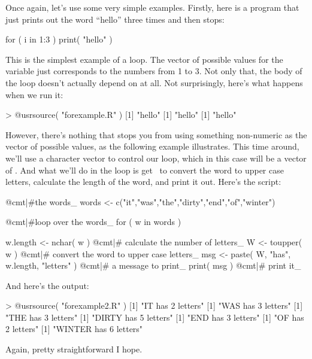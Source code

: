 Once again, let's use some very simple examples. Firstly, here is a program that just prints out the word ``hello'' three times and then stops:

\begin{script}
for ( i in 1:3 ) {
  print( "hello" )
}
\end{script}
This is the simplest example of a  loop. The vector of possible values for the  variable just corresponds to the numbers from 1 to 3. Not only that, the body of the loop doesn't actually depend on  at all. Not surprisingly, here's what happens when we run it:
\begin{rblock1}
> @usr{source( "forexample.R" )}
[1] "hello"
[1] "hello"
[1] "hello"
\end{rblock1}
However, there's nothing that stops you from using something non-numeric as the vector of possible values, as the following example illustrates. This time around, we'll use a character vector to control our loop, which in this case will be a vector of . And what we'll do in the loop is get \R\ to convert the word to upper case letters, calculate the length of the word, and print it out. Here's the script: 

\begin{script}
@cmt|#the words_
words <- c("it","was","the","dirty","end","of","winter")

@cmt|#loop over the words_
for ( w in words ) {

  w.length <- nchar( w )     @cmt|# calculate the number of letters_
  W <- toupper( w )          @cmt|# convert the word to upper case letters_
  msg <- paste( W, "has", w.length, "letters" )   @cmt|# a message to print_
  print( msg )               @cmt|# print it_
  
}
\end{script}
And here's the output:
\begin{rblock1}
> @usr{source( "forexample2.R" )}
[1] "IT has 2 letters"
[1] "WAS has 3 letters"
[1] "THE has 3 letters"
[1] "DIRTY has 5 letters"
[1] "END has 3 letters"
[1] "OF has 2 letters"
[1] "WINTER has 6 letters"
\end{rblock1}
Again, pretty straightforward I hope.


